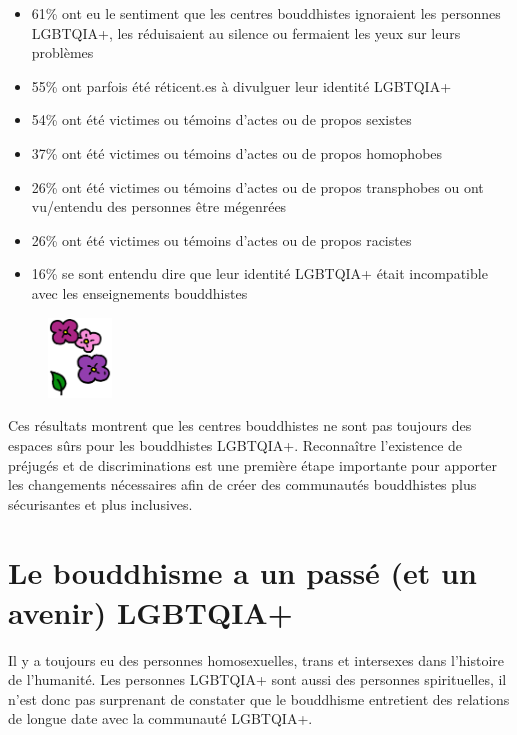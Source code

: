 \documentclass[12pt,openany]{book}
\begin{document}
\begin{itemize}[label=\textbullet, leftmargin=*]
\setlength\itemsep{-0.3em}
  \item 61\% ont eu le sentiment que les centres bouddhistes ignoraient les personnes \mbox{LGBTQIA+}, les réduisaient au silence ou fermaient les yeux sur leurs problèmes
  \item 55\% ont parfois été réticent.es à divulguer leur identité \mbox{LGBTQIA+}
  \item 54\% ont été victimes ou témoins d’actes ou de propos sexistes
  \item 37\% ont été victimes ou témoins d’actes ou de propos homophobes
  \item 26\% ont été victimes ou témoins d’actes ou de propos transphobes ou ont vu/entendu des personnes être mégenrées
  \item 26\% ont été victimes ou témoins d’actes ou de propos racistes
  \item 16\% se sont entendu dire que leur identité \mbox{LGBTQIA+} était incompatible avec les enseignements bouddhistes
\end{itemize}

\begin{figure}
    \centering
    \includegraphics[width=0.15\textwidth]{2c4.png}
\end{figure}

Ces résultats montrent que les centres bouddhistes ne sont pas toujours des espaces sûrs pour les bouddhistes \mbox{LGBTQIA+}. Reconnaître l’existence de préjugés et de discriminations est une première étape importante pour apporter les changements nécessaires afin de créer des communautés bouddhistes plus sécurisantes et plus inclusives.

\section*{Le bouddhisme a un passé (et un avenir) \mbox{LGBTQIA+}}

\noindent Il y a toujours eu des personnes homosexuelles, trans et intersexes dans l’histoire de l’humanité. Les personnes \mbox{LGBTQIA+} sont aussi des personnes spirituelles, il n’est donc pas surprenant de constater que le bouddhisme entretient des relations de longue date avec la communauté \mbox{LGBTQIA+}.
\end{document}
